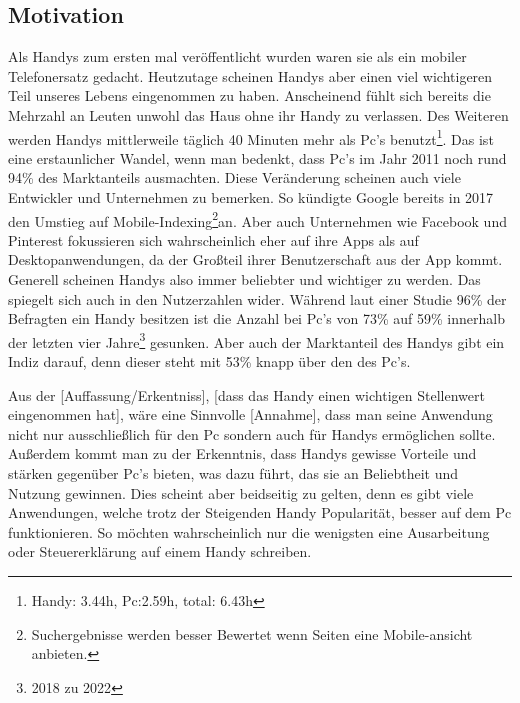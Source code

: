 \subsection{Motivation} \myCheckmark

Als Handys zum ersten mal veröffentlicht wurden waren sie als ein mobiler Telefonersatz gedacht. Heutzutage scheinen Handys aber einen viel wichtigeren Teil unseres Lebens eingenommen zu haben. Anscheinend fühlt sich bereits die Mehrzahl an Leuten unwohl das Haus ohne ihr Handy zu verlassen\cite{pcVsphone_feelingUneasyWhenLeavingPhoneHome}. Des Weiteren werden Handys mittlerweile täglich 40 Minuten mehr als Pc's benutzt\cite{pcVsphone_phoneScreenTime,pcVsphone_totalScreenTime,pcVsphone_totalScreenTime2}\footnote{Handy: 3.44h, Pc:2.59h, total: 6.43h}. Das ist eine erstaunlicher Wandel, wenn man bedenkt, dass Pc's im Jahr 2011 noch rund 94\% des Marktanteils ausmachten\cite{pcVsphone_smartphoneWebTrafficHigherThanPc}. Diese Veränderung scheinen auch viele Entwickler und Unternehmen zu bemerken. So kündigte Google bereits in 2017 den Umstieg auf Mobile-Indexing\footnote{Suchergebnisse werden besser Bewertet wenn Seiten eine Mobile-ansicht anbieten.}an\cite{pcVsphone_mobileFirstIndexing}. Aber auch Unternehmen wie Facebook und Pinterest fokussieren sich wahrscheinlich eher auf ihre Apps als auf Desktopanwendungen, da der Großteil ihrer Benutzerschaft aus der App kommt\cite{pcVsphone_socialMediaFacebookMobileUsage,pcVsphone_socialMediaPinterestMobileUsage}.\newline%
Generell scheinen Handys also immer beliebter und wichtiger zu werden. Das spiegelt sich auch in den Nutzerzahlen wider. Während laut einer Studie 96\% der Befragten ein Handy besitzen ist die Anzahl bei Pc's von 73\% auf 59\% innerhalb der letzten vier Jahre\footnote{2018 zu 2022} gesunken\cite{pcVsphone_deviceOwnership}. Aber auch der Marktanteil des Handys gibt ein Indiz darauf, denn dieser steht mit 53\% knapp über den des Pc's\cite{pcVsphone_smartphoneWebTrafficHigherThanPc}.%

\myNewSection%
\newline
Aus der [Auffassung/Erkentniss], [dass das Handy einen wichtigen Stellenwert eingenommen hat], wäre eine Sinnvolle [Annahme], dass man seine Anwendung nicht nur ausschließlich für den Pc sondern auch für Handys ermöglichen sollte.\newline%
Außerdem kommt man zu der Erkenntnis, dass Handys gewisse Vorteile und stärken gegenüber Pc's bieten, was dazu führt, das sie an Beliebtheit und Nutzung gewinnen. Dies scheint aber beidseitig zu gelten, denn es gibt viele Anwendungen, welche trotz der Steigenden Handy Popularität, besser auf dem Pc funktionieren. So möchten wahrscheinlich nur die wenigsten eine Ausarbeitung oder Steuererklärung auf einem Handy schreiben.%


